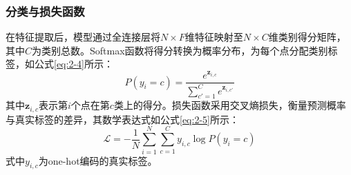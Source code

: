 \subsubsection{分类与损失函数}
在特征提取后，模型通过全连接层将$N \times F$维特征映射至$N \times C$维类别得分矩阵，其中$C$为类别总数。Softmax函数将得分转换为概率分布，为每个点分配类别标签，如公式\eqref{eq:2-4}所示：
\begin{equation}
    \label{eq:2-4}
    P(y_i=c) = \frac{e^{\mathbf{z}_{i,c}}}{\sum_{c'=1}^C e^{\mathbf{z}_{i,c'}}}
\end{equation}
其中$\mathbf{z}_{i,c}$表示第$i$个点在第$c$类上的得分。损失函数采用交叉熵损失，衡量预测概率与真实标签的差异，其数学表达式如公式\eqref{eq:2-5}所示：
\begin{equation}
    \label{eq:2-5}
    \mathcal{L} = -\frac{1}{N} \sum_{i=1}^N \sum_{c=1}^C y_{i,c} \log P(y_i=c)
\end{equation}
式中$y_{i,c}$为one-hot编码的真实标签。%



